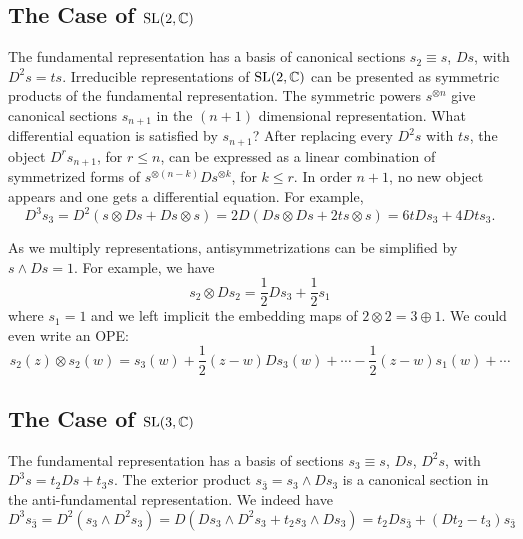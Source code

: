 \documentclass[11pt,a4paper]{article}
\begin{document}
\subsection{The Case of ${\mathrm{SL}}(2,{\mathbb C})$}
The fundamental representation has a basis of canonical sections $s_2 \equiv s$, $Ds$, with $D^2 s = t s$. 
Irreducible representations of ${\mathrm{SL}}(2,{\mathbb C})$ can be presented as symmetric products of the fundamental representation. 
The symmetric powers $s^{\otimes n}$ give canonical sections $s_{n+1}$ in the $(n+1)$ dimensional representation.  What differential equation is
satisfied by $s_{n+1}$?
After replacing every $D^2 s$ with $t s$, the object
$D^r s_{n+1}$, for $r\leq n$, can be expressed as a linear combination of symmetrized forms of $s^{\otimes (n-k)} Ds ^{\otimes k}$, for $k\leq r$.
In order  $n+1$, no new object appears and one gets a differential equation.  For example,
\begin{equation}
D^3 s_3= D^2(s \otimes Ds + Ds \otimes s) =2 D(Ds \otimes Ds + 2 t s \otimes s) = 6 t Ds_3 + 4 Dt s_3.
\end{equation}


As we multiply representations, antisymmetrizations can be simplified by $s \wedge Ds=1$. For example, we have 
\begin{equation}
s_2 \otimes Ds_2 = \frac12 D s_3 + \frac12 s_1
\end{equation}
where $s_1=1$ and we left implicit the embedding maps of $2 \otimes 2 = 3\oplus 1$. We could even write an OPE:
\begin{equation}
s_2(z) \otimes s_2(w) = s_3(w) + \frac12(z-w)Ds_3(w) + \cdots - \frac12 (z-w) s_1(w)+ \cdots
\end{equation}
 
\subsection{The Case of ${\mathrm{SL}}(3,{\mathbb C})$}
The fundamental representation has a basis of sections $s_3 \equiv s$, $Ds$, $D^2s$, with $D^3 s = t_2 Ds +t_3 s$. 
The exterior product $s_{\bar 3} = s_3 \wedge Ds_3$ is a canonical section in the anti-fundamental representation. We indeed have
\begin{equation}
D^3s_{\bar 3} = D^2(s_3 \wedge D^2s_3) = D(D s_3 \wedge D^2s_3+t_2 s_3 \wedge D s_3) = t_2 Ds_{\bar 3} + (D t_2-t_3) s_{\bar 3}
\end{equation}
\end{document}

